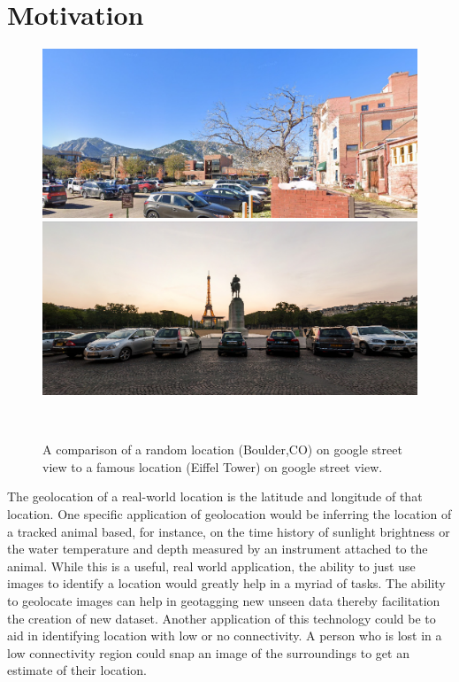 \documentclass{sigchi}
\begin{document}
\section{Motivation}
\begin{figure}
  \centering
  \includegraphics[width=0.6\columnwidth]{figures/perlStreetView.png}
  \includegraphics[width=0.6\columnwidth]{figures/eiffle.png}
  \caption{A comparison of a random location (Boulder,CO) on google street view to a famous location (Eiffel Tower) on google street view.}~\label{fig:figure1}
\end{figure}
The geolocation of a real-world location is the latitude and longitude of that location. One specific application of geolocation would be inferring the location of a tracked animal based, for instance, on the time history of sunlight brightness or the water temperature and depth measured by an instrument attached to the animal. While this is a useful, real world application, the ability to just use images to identify a location would greatly help in a myriad of tasks. The ability to geolocate images can help in geotagging new unseen data thereby facilitation the creation of new dataset. Another application of this technology could be to aid in identifying location with low or no connectivity. A person who is lost in a low connectivity region could snap an image of the surroundings to get an estimate of their location. \\
\end{document}
